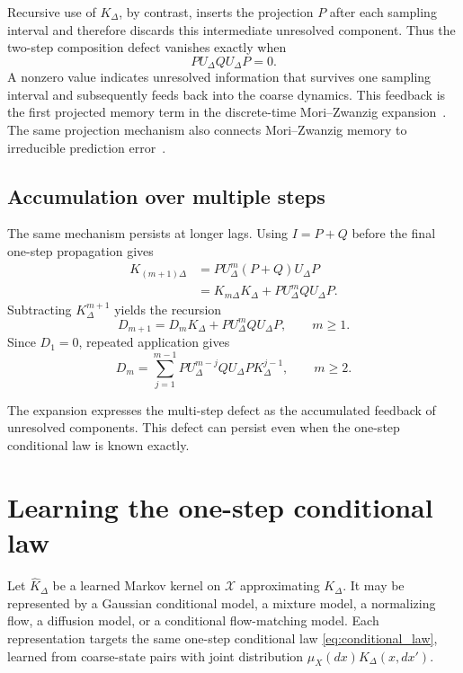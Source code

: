 \documentclass[final,hidelinks]{siamart251216}
\newcommand{\cX}{\mathcal{X}}
\begin{document}
Recursive use of $K_\Delta$, by contrast, inserts the projection $P$ after
each sampling interval and therefore discards this intermediate unresolved
component. Thus the two-step composition defect vanishes exactly when
\[
    P U_\Delta Q U_\Delta P=0.
\]
A nonzero value indicates unresolved information that survives one sampling interval and subsequently feeds back into the coarse dynamics. This feedback is the first projected memory term in the discrete-time Mori--Zwanzig expansion~\cite{zwanzig1961,mori1965,chorin2000,chorin2002}. The same projection mechanism also connects Mori--Zwanzig memory to irreducible prediction error~\cite{lozanoduran2026ladder}.

\subsection{Accumulation over multiple steps}

The same mechanism persists at longer lags.  Using $I=P+Q$ before the final
one-step propagation gives
\begin{align}
    K_{(m+1)\Delta}
    &=
    P U_\Delta^{m}(P+Q)U_\Delta P \nonumber\\
    &=
    K_{m\Delta}K_\Delta
    +
    P U_\Delta^{m}Q U_\Delta P.
    \label{eq:mstep_projection_recursion}
\end{align}
Subtracting $K_\Delta^{m+1}$ yields the recursion
\begin{equation}
    D_{m+1}
    =
    D_m K_\Delta
    +
    P U_\Delta^{m}Q U_\Delta P,
    \qquad m\ge1.
    \label{eq:defect_recursion}
\end{equation}
Since $D_1=0$, repeated application gives
\begin{equation}
    D_m
    =
    \sum_{j=1}^{m-1}
    P U_\Delta^{m-j}Q U_\Delta P
    K_\Delta^{j-1},
    \qquad m\ge2.
    \label{eq:defect_expansion}
\end{equation}

The expansion expresses the multi-step defect as the accumulated feedback
of unresolved components. This defect can persist even when the one-step
conditional law is known exactly.

\section{Learning the one-step conditional law}
\label{sec:learning}

Let $\widehat K_\Delta$ be a learned Markov kernel on $\cX$ approximating
$K_\Delta$. It may be represented by a Gaussian conditional model, a
mixture model, a normalizing flow, a diffusion model, or a conditional
flow-matching model. Each representation targets the same one-step
conditional law \eqref{eq:conditional_law}, learned from coarse-state
pairs with joint distribution $\mu_X(dx)K_\Delta(x,dx')$.
\end{document}

